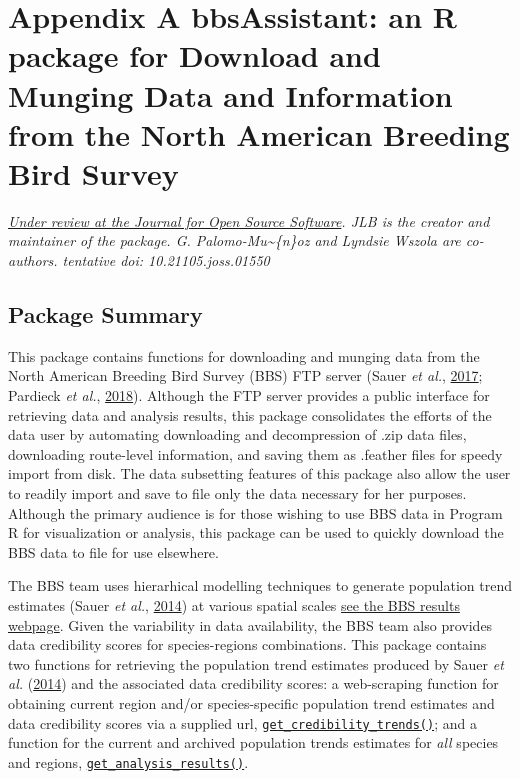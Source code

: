 \documentclass[12pt,twoside,openany]{reedthesis}
\begin{document}
\hypertarget{bbsAssistant}{%
\chapter*{Appendix A bbsAssistant: an R package for Download and Munging Data and Information from the North American Breeding Bird Survey}\label{bbsAssistant}}

\emph{\href{https://github.com/openjournals/joss-papers/tree/joss.01550/joss.01550}{Under review at the Journal for Open Source Software}. JLB is the creator and maintainer of the package. G. Palomo-Mu\textasciitilde\{n\}oz and Lyndsie Wszola are co-authors. tentative doi: 10.21105.joss.01550}

\hypertarget{package-summary}{%
\section{Package Summary}\label{package-summary}}

This package contains functions for downloading and munging data from the North American Breeding Bird Survey (BBS) FTP server (Sauer \emph{et al.}, \protect\hyperlink{ref-sauer2017first}{2017}; Pardieck \emph{et al.}, \protect\hyperlink{ref-pardieck2018north}{2018}). Although the FTP server provides a public interface for retrieving data and analysis results, this package consolidates the efforts of the data user by automating downloading and decompression of .zip data files, downloading route-level information, and saving them as .feather files for speedy import from disk. The data subsetting features of this package also allow the user to readily import and save to file only the data necessary for her purposes. Although the primary audience is for those wishing to use BBS data in Program R for visualization or analysis, this package can be used to quickly download the BBS data to file for use elsewhere.

The BBS team uses hierarhical modelling techniques to generate population trend estimates (Sauer \emph{et al.}, \protect\hyperlink{ref-sauer2017results}{2014}) at various spatial scales \href{https://www.mbr-pwrc.usgs.gov/}{see the BBS results webpage}. Given the variability in data availability, the BBS team also provides data credibility scores for species-regions combinations. This package contains two functions for retrieving the population trend estimates produced by Sauer \emph{et al.} (\protect\hyperlink{ref-sauer2017results}{2014}) and the associated data credibility scores: a web-scraping function for obtaining current region and/or species-specific population trend estimates and data credibility scores via a supplied url, \href{https://github.com/TrashBirdEcology/bbsAssistant/blob/master/R/get_credibility_trends.R}{\texttt{get\_credibility\_trends()}}; and a function for the current and archived population trends estimates for \emph{all} species and regions, \href{https://github.com/TrashBirdEcology/bbsAssistant/blob/master/R/get_analysis_results.R}{\texttt{get\_analysis\_results()}}.
\end{document}

